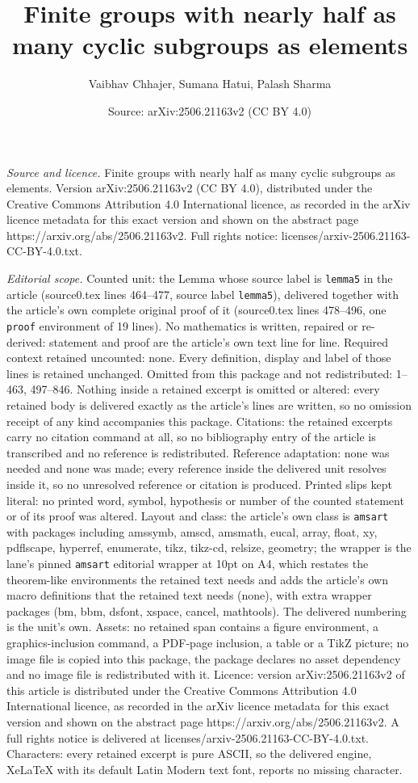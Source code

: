 \documentclass[10pt,a4paper]{amsart}
\title[Finite groups with nearly half as many cyclic subgroups as e]{Finite groups with nearly half as many cyclic subgroups as elements}
\author{Vaibhav Chhajer, Sumana Hatui, Palash Sharma}
\date{Source: arXiv:2506.21163v2 (CC BY 4.0)}
\begin{document}
\maketitle

\noindent\emph{Source and licence.} Finite groups with nearly half as many cyclic subgroups as elements. Version arXiv:2506.21163v2 (CC BY 4.0), distributed under the Creative Commons Attribution 4.0 International licence, as recorded in the arXiv licence metadata for this exact version and shown on the abstract page https://arxiv.org/abs/2506.21163v2. Full rights notice: licenses/arxiv-2506.21163-CC-BY-4.0.txt.\par\smallskip

\noindent\textit{Editorial scope.} Counted unit: the Lemma whose source label is \texttt{lemma5} in the article (source0.tex lines 464--477, source label \texttt{lemma5}), delivered together with the article's own complete original proof of it (source0.tex lines 478--496, one \texttt{proof} environment of 19 lines). No mathematics is written, repaired or re-derived: statement and proof are the article's own text line for line. Required context retained uncounted: none. Every definition, display and label of those lines is retained unchanged. Omitted from this package and not redistributed: 1--463, 497--846. Nothing inside a retained excerpt is omitted or altered: every retained body is delivered exactly as the article's lines are written, so no omission receipt of any kind accompanies this package. Citations: the retained excerpts carry no citation command at all, so no bibliography entry of the article is transcribed and no reference is redistributed. Reference adaptation: none was needed and none was made; every reference inside the delivered unit resolves inside it, so no unresolved reference or citation is produced. Printed slips kept literal: no printed word, symbol, hypothesis or number of the counted statement or of its proof was altered. Layout and class: the article's own class is \texttt{amsart} with packages including amssymb, amscd, amsmath, eucal, array, float, xy, pdflscape, hyperref, enumerate, tikz, tikz-cd, relsize, geometry; the wrapper is the lane's pinned \texttt{amsart} editorial wrapper at 10pt on A4, which restates the theorem-like environments the retained text needs and adds the article's own macro definitions that the retained text needs (none), with extra wrapper packages (bm, bbm, dsfont, xspace, cancel, mathtools). The delivered numbering is the unit's own. Assets: no retained span contains a figure environment, a graphics-inclusion command, a PDF-page inclusion, a table or a TikZ picture; no image file is copied into this package, the package declares no asset dependency and no image file is redistributed with it. Licence: version arXiv:2506.21163v2 of this article is distributed under the Creative Commons Attribution 4.0 International licence, as recorded in the arXiv licence metadata for this exact version and shown on the abstract page https://arxiv.org/abs/2506.21163v2. A full rights notice is delivered at licenses/arxiv-2506.21163-CC-BY-4.0.txt. Characters: every retained excerpt is pure ASCII, so the delivered engine, XeLaTeX with its default Latin Modern text font, reports no missing character.
\end{document}

